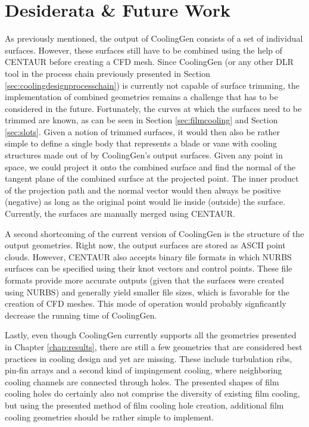 \documentclass[a4paper, 11pt]{report}
\theoremstyle{definition}
\begin{document}
	\section{Desiderata \& Future Work}
		As previously mentioned, the output of CoolingGen consists of a set of individual surfaces. However, these surfaces still have to be combined using the help of CENTAUR before creating a CFD mesh. Since CoolingGen (or any other DLR tool in the process chain previously presented in Section \ref{sec:coolingdesignprocesschain}) is currently not capable of surface trimming, the implementation of combined geometries remains a challenge that has to be considered in the future. Fortunately, the curves at which the surfaces need to be trimmed are known, as can be seen in Section \ref{sec:filmcooling} and Section \ref{sec:slots}. Given a notion of trimmed surfaces, it would then also be rather simple to define a single body that represents a blade or vane with cooling structures made out of by CoolingGen's output surfaces. Given any point in space, we could project it onto the combined surface and find the normal of the tangent plane of the combined surface at the projected point. The inner product of the projection path and the normal vector would then always be positive (negative) as long as the original point would lie inside (outside) the surface. Currently, the surfaces are manually merged using CENTAUR.

		A second shortcoming of the current version of CoolingGen is the structure of the output geometries. Right now, the output surfaces are stored as ASCII point clouds. However, CENTAUR also accepts binary file formats in which NURBS surfaces can be specified using their knot vectors and control points. These file formats provide more accurate outputs (given that the surfaces were created using NURBS) and generally yield smaller file sizes, which is favorable for the creation of CFD meshes. This mode of operation would probably signficantly decrease the running time of CoolingGen.

		Lastly, even though CoolingGen currently supports all the geometries presented in Chapter \ref{chap:results}, there are still a few geometries that are considered best practices in cooling design and yet are missing. These include turbulation ribs, pin-fin arrays and a second kind of impingement cooling, where neighboring cooling channels are connected through holes. The presented shapes of film cooling holes do certainly also not comprise the diversity of existing film cooling, but using the presented method of film cooling hole creation, additional film cooling geometries should be rather simple to implement.

\printbibliography[heading=bibnumbered, title=References]
\end{document}
